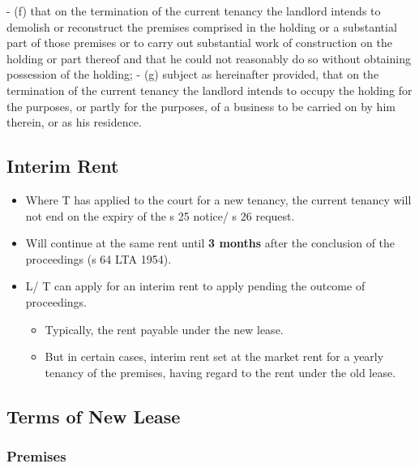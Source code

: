 \documentclass[
]{article}
\newenvironment{Shaded}{}{}
\newcommand{\NormalTok}[1]{#1}
\providecommand{\tightlist}{%
  \setlength{\itemsep}{0pt}\setlength{\parskip}{0pt}}
\begin{document}
\begin{Shaded}
\begin{Highlighting}[]
\NormalTok{{-} (f) that on the termination of the current tenancy the landlord intends to demolish or reconstruct the premises comprised in the holding or a substantial part of those premises or to carry out substantial work of construction on the holding or part thereof and that he could not reasonably do so without obtaining possession of the holding;}
\NormalTok{{-} (g) subject as hereinafter provided, that on the termination of the current tenancy the landlord intends to occupy the holding for the purposes, or partly for the purposes, of a business to be carried on by him therein, or as his residence.}
\end{Highlighting}
\end{Shaded}

\hypertarget{interim-rent}{%
\subsection{Interim Rent}\label{interim-rent}}

\begin{itemize}
\tightlist
\item
  Where T has applied to the court for a new tenancy, the current
  tenancy will not end on the expiry of the s 25 notice/ s 26 request.
\item
  Will continue at the same rent until \textbf{3 months} after the
  conclusion of the proceedings (s 64 LTA 1954).
\item
  L/ T can apply for an interim rent to apply pending the outcome of
  proceedings.

  \begin{itemize}
  \tightlist
  \item
    Typically, the rent payable under the new lease.
  \item
    But in certain cases, interim rent set at the market rent for a
    yearly tenancy of the premises, having regard to the rent under the
    old lease.
  \end{itemize}
\end{itemize}

\hypertarget{terms-of-new-lease}{%
\subsection{Terms of New Lease}\label{terms-of-new-lease}}

\hypertarget{premises}{%
\subsubsection{Premises}\label{premises}}
\end{document}
